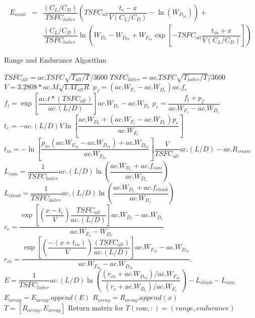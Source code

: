 \begin{eqnarray}
\label{eq:EnduranceWithRange}
    E_{avail} & = &\dfrac{(C_L/C_D)}{TSFC_{loiter}}\left(TSFC_{alt}\dfrac{t_{e}-x}{V(C_L/C_D)}-\ln\left(W_{D_{in}}\right)\right) + \nonumber \\
    & &\dfrac{(C_L/C_D)}{TSFC_{loiter}}\ln\left(W_{D_{e}}-W_{D_{in}}+W_{F_{in}}\exp\left[-TSFC_{alt}\dfrac{t_{in}+x}{V(C_L/C_D)}\right]\right)
\end{eqnarray}
\begin{algorithm}[H]
\caption{Range and Endurance Algorithm}
\label{Alg:R&E}
\begin{algorithmic}
\State $TSFC_{alt} = ac.TSFC\sqrt{T_{alt}/T}/3600$
\State $TSFC_{loiter} = ac.TSFC\sqrt{T_{loiter}/T}/3600$
\State $V = 3.2808*ac.M\sqrt{1.4T_{alt}R}$
\State $p_f = (ac.W_{F_{e}}-ac.W_{D_{e}})ac.f_r$
\State $f_t = \exp\left[\dfrac{ac.t*(TSFC_{alt})}{ac.(L/D)}\right]ac.W_{D_{e}}-ac.W_{D_{e}}$
\State $p_e = \dfrac{f_t + p_f}{ac.W_{F_{e}}-ac.W_{D_{e}}}$
\State $t_{e} = -ac.(L/D)V\ln\left[\dfrac{ac.W_{D_{e}}+(ac.W_{F_{e}}-ac.W_{D_{e}})p_e}{ac.W_{F_{e}}}\right]$
\State $t_{in} = -\ln\left[\dfrac{p_{in}(ac.W_{F_{in}}-ac.W_{D_{in}})+ac.W_{D_{in}}}{ac.W_{F_{in}}}\right]\dfrac{V}{TSFC_{alt}}ac.(L/D)-ac.R_{cruise}$
\State $L_{com} = \dfrac{1}{TSFC_{loiter}}ac.(L/D)\ln\left(\dfrac{ac.W_{D_{e}}+ac.f_{com}}{ac.W_{D_{e}}}\right)$
\State $L_{climb} = \dfrac{1}{TSFC_{loiter}}ac.(L/D)\ln\left(\dfrac{ac.W_{D_{e}}+ac.f_{climb}}{ac.W_{D_{e}}}\right)$
    \State $r_{e}=\dfrac{\exp\left[\left(\dfrac{x-t_e}{V}\right)\dfrac{TSFC_{alt}}{ac.(L/D)}\right]ac.W_{D_{e}}-ac.W_{D_{e}}}{ac.W_{F_{e}} - W_{D_{e}}}$
    \State $r_{in} = \dfrac{\exp\left[\left(\dfrac{-(x+t_{in})}{V}\right)\dfrac{(TSFC_{alt})}{ac.(L/D)}\right]ac.W_{F_{in}}-ac.W_{D_{in}}}{ac.W_{F_{in}} - ac.W_{D_{in}}}.$
    \State $E = \dfrac{1}{TSFC_{loiter}}ac.(L/D)\ln\left(\dfrac{(r_{in}+ ac.W_{D_{in}})/ac.W_{F_{in}}}{(r_{e}+ac.W_{D_{e}})/ac.W_{F_{e}}}\right) - L_{climb}-L_{com}$
    \State $E_{array} = E_{array}.append(E)$
    \State $R_{array} = R_{array}.append(x)$
\EndFor\\
\Return $T = [R_{array}, E_{array}]$ \Comment Return matrix for $T(row,:) = (range,endurance)$
\end{algorithmic}
\end{algorithm}
